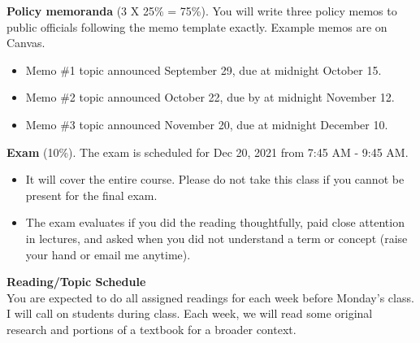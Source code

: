 \documentclass[12pt]{article}
\begin{document}
\noindent \textbf{Policy memoranda} (3 X 25\% = 75\%).
You will write three policy memos to public officials following the memo template exactly.  Example memos are on Canvas. %
\begin{itemize}
\item Memo \#1 topic announced September 29, due at midnight October 15.

\item Memo \#2 topic announced October 22, due by at midnight November 12.

\item Memo \#3 topic announced November 20, due at midnight December 10.
\end{itemize}


\noindent \textbf{Exam} (10\%).  The exam is scheduled for Dec 20, 2021 from 7:45 AM - 9:45 AM.  

\begin{itemize}
\item It will cover the entire course.  Please do not take this class if you cannot be present for the final exam.
\item The exam evaluates if you did the reading thoughtfully, paid close attention in lectures, and asked when you did not understand a term or concept (raise your hand or email me anytime).
\end{itemize}


\noindent \Large \textbf{Reading/Topic Schedule}\normalsize\\

\noindent You are expected to do all assigned readings for each week before Monday’s class. I will call on students during class.  Each week, we will read some original research and portions of a textbook for a broader context.
\end{document}
